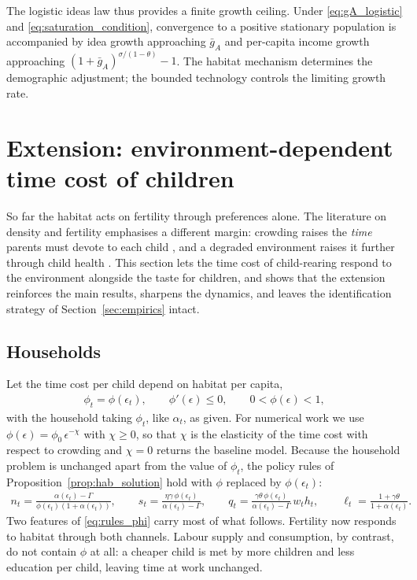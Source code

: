 \documentclass[11pt]{article}
\begin{document}
The logistic ideas law thus provides a finite growth ceiling. Under \eqref{eq:gA_logistic}
and \eqref{eq:saturation_condition}, convergence to a positive stationary population is accompanied
by idea growth approaching $\bar g_A$ and per-capita income growth approaching
$(1+\bar g_A)^{\sigma/(1-\theta)}-1$. The habitat mechanism determines the demographic adjustment;
the bounded technology controls the limiting growth rate.
\section{Extension: environment-dependent time cost of children}
\label{sec:timecost}

So far the habitat acts on fertility through preferences alone. The literature on density and
fertility emphasises a different margin: crowding raises the \emph{time} parents must devote to each
child \citep{DELACROIX2012271,dao25}, and a degraded environment raises it further through child
health \citep{mari10,Varvarigos2013}. This section lets the time cost of child-rearing respond to
the environment alongside the taste for children, and shows that the extension reinforces the main
results, sharpens the dynamics, and leaves the identification strategy of
Section~\ref{sec:empirics} intact.

\subsection{Households}
Let the time cost per child depend on habitat per capita,
\begin{align}
\phi_t=\phi(\epsilon_t),\qquad \phi'(\epsilon)\le 0,\qquad 0<\phi(\epsilon)<1,
\label{eq:phi_eps}
\end{align}
with the household taking $\phi_t$, like $\alpha_t$, as given. For numerical work we use
$\phi(\epsilon)=\phi_0\,\epsilon^{-\chi}$ with $\chi\ge 0$, so that $\chi$ is the elasticity of the
time cost with respect to crowding and $\chi=0$ returns the baseline model. Because the household
problem is unchanged apart from the value of $\phi_t$, the policy rules of
Proposition~\ref{prop:hab_solution} hold with $\phi$ replaced by $\phi(\epsilon_t)$:
\begin{align}
n_t=\frac{\alpha(\epsilon_t)-\Gamma}{\phi(\epsilon_t)\left(1+\alpha(\epsilon_t)\right)},
\qquad
s_t=\frac{\eta\gamma\,\phi(\epsilon_t)}{\alpha(\epsilon_t)-\Gamma},
\qquad
q_t=\frac{\gamma\theta\,\phi(\epsilon_t)}{\alpha(\epsilon_t)-\Gamma}\,w_th_t,
\qquad
\ell_t=\frac{1+\gamma\theta}{1+\alpha(\epsilon_t)} .
\label{eq:rules_phi}
\end{align}
Two features of \eqref{eq:rules_phi} carry most of what follows. Fertility now responds to habitat
through both channels. Labour supply and consumption, by contrast, do not contain $\phi$ at all: a
cheaper child is met by more children and less education per child, leaving time at work unchanged.
\end{document}
